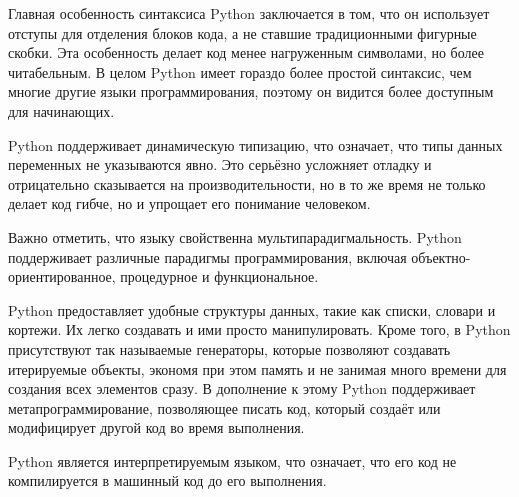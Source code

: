 Главная особенность синтаксиса Python заключается в том, что он использует отступы для отделения блоков кода, а не ставшие традиционными фигурные скобки. Эта особенность делает код менее нагруженным символами, но более читабельным. В целом Python имеет гораздо более простой синтаксис, чем многие другие языки программирования, поэтому он видится более доступным для начинающих\cite{HABR_ABOUT_PYTHON}.

Python поддерживает динамическую типизацию, что означает, что типы данных переменных не указываются явно. Это серьёзно усложняет отладку и отрицательно сказывается на производительности, но в то же время не только делает код гибче, но и упрощает его понимание человеком.

Важно отметить, что языку свойственна мультипарадигмальность. Python поддерживает различные парадигмы программирования, включая объектно-\\ориентированное, процедурное и функциональное.

Python предоставляет удобные структуры данных, такие как списки, словари и кортежи. Их легко создавать и ими просто манипулировать. Кроме того, в Python присутствуют так называемые генераторы, которые позволяют создавать итерируемые объекты, экономя при этом память и не занимая много времени для создания всех элементов сразу. В дополнение к этому Python поддерживает метапрограммирование, позволяющее писать код, который создаёт или модифицирует другой код во время выполнения.

Python является интерпретируемым языком, что означает, что его код не компилируется в машинный код до его выполнения.